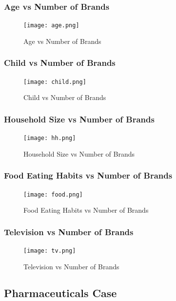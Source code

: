 \documentclass[11pt]{article}
\begin{document}
\subsubsection{Age vs Number of Brands}
\begin{figure}[H]
    \centering
    \texttt{[image: age.png]}
    \caption{Age vs Number of Brands}
    \label{lr}
\end{figure}

\subsubsection{Child vs Number of Brands}
\begin{figure}[H]
    \centering
    \texttt{[image: child.png]}
    \caption{Child vs Number of Brands}
    \label{lr}
\end{figure}

\subsubsection{Household Size vs Number of Brands}
\begin{figure}[H]
    \centering
    \texttt{[image: hh.png]}
    \caption{Household Size vs Number of Brands}
    \label{lr}
\end{figure}

\subsubsection{Food Eating Habits vs Number of Brands}
\begin{figure}[H]
    \centering
    \texttt{[image: food.png]}
    \caption{Food Eating Habits vs Number of Brands}
    \label{lr}
\end{figure}

\subsubsection{Television vs Number of Brands}
\begin{figure}[H]
    \centering
    \texttt{[image: tv.png]}
    \caption{Television vs Number of Brands}
    \label{lr}
\end{figure}

\newpage




\subsection{Pharmaceuticals Case}
\end{document}
